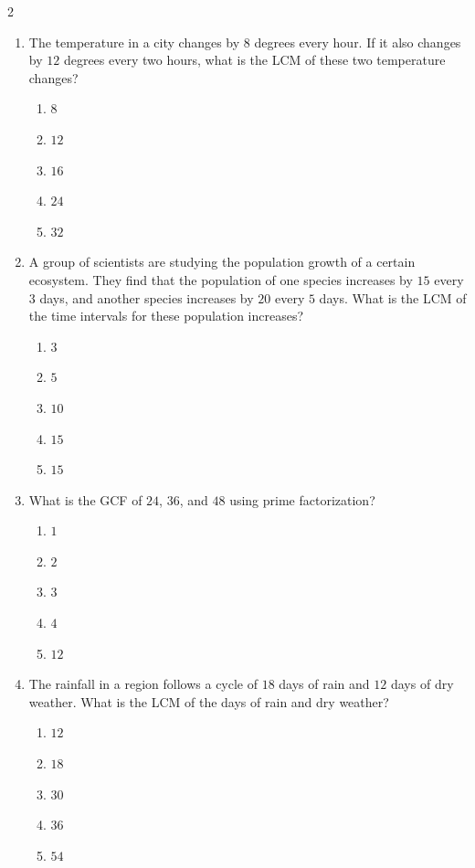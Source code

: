 \documentclass[10pt]{article}
\begin{document}
\begin{multicols}{2}
\begin{enumerate}[label=\textbf{Q\arabic*.}, leftmargin=*, itemsep=6pt, parsep=0pt]
  \item \small The temperature in a city changes by $8$ degrees every hour. If it also changes by $12$ degrees every two hours, what is the LCM of these two temperature changes?
  \begin{enumerate}[label=(\Alph*), leftmargin=0.6cm, nosep, itemsep=2pt]
    \item $8$
    \item $12$
    \item $16$
    \item $24$
    \item $32$
  \end{enumerate}

  \item \small A group of scientists are studying the population growth of a certain ecosystem. They find that the population of one species increases by $15$ every $3$ days, and another species increases by $20$ every $5$ days. What is the LCM of the time intervals for these population increases?
  \begin{enumerate}[label=(\Alph*), leftmargin=0.6cm, nosep, itemsep=2pt]
    \item $3$
    \item $5$
    \item $10$
    \item $15$
    \item $15$
  \end{enumerate}

  \item \small What is the GCF of $24$, $36$, and $48$ using prime factorization?
  \begin{enumerate}[label=(\Alph*), leftmargin=0.6cm, nosep, itemsep=2pt]
    \item $1$
    \item $2$
    \item $3$
    \item $4$
    \item $12$
  \end{enumerate}

  \item \small The rainfall in a region follows a cycle of $18$ days of rain and $12$ days of dry weather. What is the LCM of the days of rain and dry weather?
  \begin{enumerate}[label=(\Alph*), leftmargin=0.6cm, nosep, itemsep=2pt]
    \item $12$
    \item $18$
    \item $30$
    \item $36$
    \item $54$
  \end{enumerate}


\end{enumerate}
\end{multicols}
\end{document}
